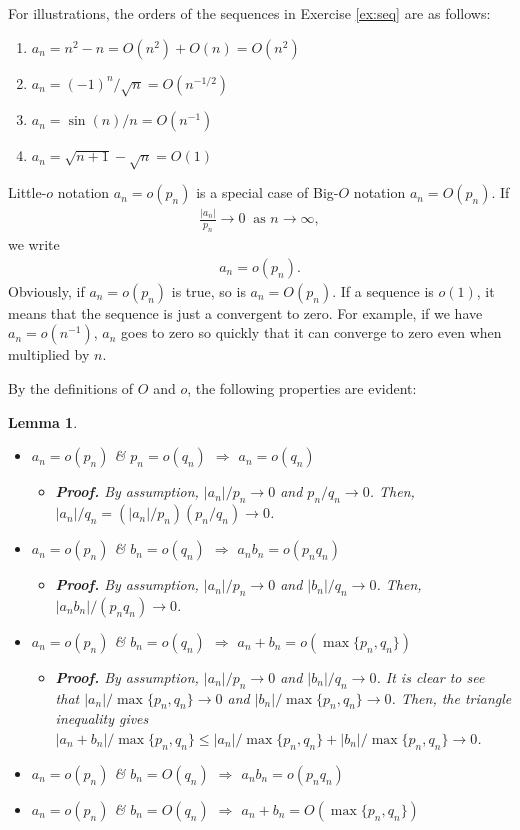 \documentclass[10.5pt, A4paper, openany, uplatex]{book}
\newtheorem{lemma}[theorem]{Lemma}
\numberwithin{equation}{section}
\begin{document}
For illustrations, the orders of the sequences in Exercise \ref{ex:seq} are as follows:
\begin{enumerate}
	\item $a_n = n^2 - n = O(n^2) + O(n) = O(n^2)$
	\item $a_n = (-1)^n/\sqrt{n} = O(n^{-1/2})$
	\item $a_n = \sin(n)/n = O(n^{-1})$
	\item $a_n = \sqrt{n + 1} - \sqrt{n} = O(1)$
\end{enumerate}


Little-$o$ notation $a_n = o(p_n)$ is a special case of Big-$O$ notation $a_n = O(p_n)$.
If
\begin{align*}
	\frac{|a_n|}{p_n} \to 0 \;\; \text{as $n \to \infty$},
\end{align*}
we write
\begin{align*}
	a_n = o(p_n).
\end{align*}
Obviously, if $a_n = o(p_n)$ is true, so is $a_n = O(p_n)$.
If a sequence is $o(1)$, it means that the sequence is just a convergent to zero.
For example, if we have $a_n = o(n^{-1})$, $a_n$ goes to zero so quickly that it can converge to zero even when multiplied by $n$.

By the definitions of $O$ and $o$, the following properties are evident:
\begin{lemma}\label{lem:smallo}
\begin{itemize}
	\item $a_n = o(p_n)$ \& $p_n = o(q_n)$ $\Longrightarrow$ $a_n = o(q_n)$
	\begin{itemize}
		\item \upshape \textbf{Proof.} By assumption, $|a_n|/p_n \to 0$ and $p_n/q_n \to 0$. Then, $|a_n|/q_n = (|a_n|/p_n)(p_n/q_n) \to 0$.
	\end{itemize}
	\item $a_n = o(p_n)$ \& $b_n = o(q_n)$ $\Longrightarrow$ $a_n b_n = o(p_n q_n)$
	\begin{itemize}
		\item \upshape \textbf{Proof.} By assumption, $|a_n|/p_n \to 0$ and $|b_n|/q_n \to 0$.
		Then, $|a_n b_n|/(p_n q_n) \to 0$.
	\end{itemize}
	\item $a_n = o(p_n)$ \& $b_n = o(q_n)$ $\Longrightarrow$ $a_n + b_n = o(\max\{p_n, q_n\})$
	\begin{itemize}
		\item \upshape \textbf{Proof.} By assumption, $|a_n|/p_n \to 0$ and $|b_n|/q_n \to 0$.
		It is clear to see that $|a_n|/\max\{p_n, q_n\} \to 0$ and $|b_n|/\max\{p_n, q_n\} \to 0$.
		Then, the triangle inequality gives $|a_n + b_n|/\max\{p_n, q_n\} \le |a_n|/\max\{p_n, q_n\} + |b_n|/\max\{p_n, q_n\} \to 0$.
	\end{itemize}
	\item[$\spadesuit$] $a_n = o(p_n)$ \& $b_n = O(q_n)$ $\Longrightarrow$ $a_n b_n = o(p_n q_n)$
	\item[$\clubsuit$] $a_n = o(p_n)$ \& $b_n = O(q_n)$ $\Longrightarrow$ $a_n + b_n = O(\max\{p_n, q_n\})$
\end{itemize}
\end{lemma}
\end{document}
